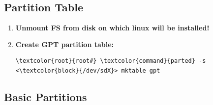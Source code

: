 \documentclass[10pt, a4paper, onecolumn, oneside, titlepage, openany]{book}
\begin{document}
\subsection{Partition Table}
\begin{enumerate}
    \item \textbf{Unmount FS from disk on which linux will be installed!}
    \item \textbf{Create GPT partition table:}
\begin{Verbatim}[commandchars=\\\{\}]
\textcolor{root}{root#} \textcolor{command}{parted} -s <\textcolor{block}{/dev/sdX}> mktable gpt
\end{Verbatim}
\end{enumerate}
\subsection{Basic Partitions}
\end{document}
